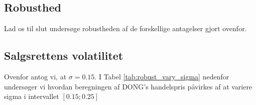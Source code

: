 \documentclass{article}
\begin{document}
\begin{appendices}




\section{Robusthed}
\label{sec:antag}
Lad os til slut undersøge robustheden af de forskellige antagelser gjort ovenfor. 

\subsection{Salgsrettens volatilitet}

Ovenfor antog vi, at $\sigma=0.15$. I Tabel \ref{tab:robust_vary_sigma} nedenfor undersøger vi hvordan beregningen af DONG's handelspris påvirkes af at variere sigma i intervallet $\left[ 0.15; 0.25 \right]$


\end{appendices}
\end{document}
